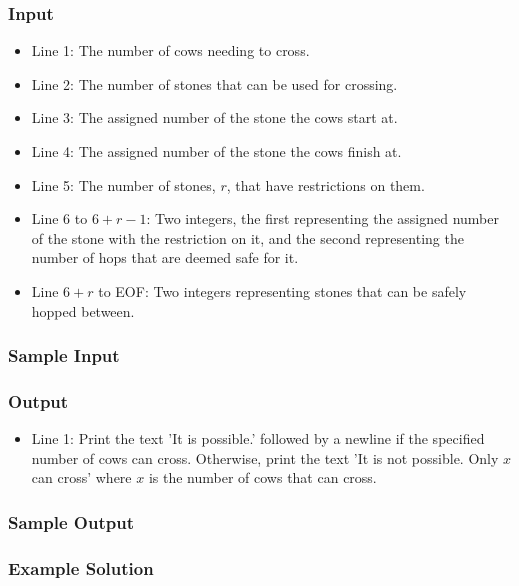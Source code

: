 \subsubsection{Input}
\begin{itemize}
	\item Line 1: The number of cows needing to cross.
	\item Line 2: The number of stones that can be used for crossing.
	\item Line 3: The assigned number of the stone the cows start at.
	\item Line 4: The assigned number of the stone the cows finish at.
	\item Line 5: The number of stones, $r$, that have restrictions on them.
	\item Line 6 to $6 + r - 1$: Two integers, the first representing the assigned number of the stone with the restriction on it, and the second representing the number of hops that are deemed safe for it.
	\item Line $6 + r$ to EOF: Two integers representing stones that can be safely hopped between.
\end{itemize}

\subsubsection{Sample Input}

\subsubsection{Output}
\begin{itemize}
	\item Line 1: Print the text 'It is possible.' followed by a newline if the specified number of cows can cross.
		Otherwise, print the text 'It is not possible. Only $x$ can cross' where $x$ is the number of cows that can cross.
\end{itemize}

\subsubsection{Sample Output}

\subsubsection{Example Solution}
